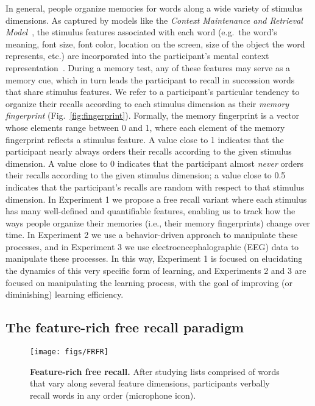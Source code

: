 In general, people organize memories for words along a wide variety of stimulus dimensions.  As captured by models like the \textit{Context Maintenance and Retrieval Model}~\citep{PolyEtal09}, the stimulus features associated with each word (e.g.\ the word's meaning, font size, font color, location on the screen, size of the object the word represents, etc.) are incorporated into the participant's mental context representation~\citep[also see][]{SmitVela01, MannEtal15}.  During a memory test, any of these features may serve as a memory cue, which in turn leads the participant to recall in succession words that share stimulus features.  We refer to a participant's particular tendency to organize their recalls according to each stimulus dimension as their \textit{memory fingerprint} (Fig.~\ref{fig:fingerprint}).  Formally, the memory fingerprint is a vector whose elements range between 0 and 1, where each element of the memory fingerprint reflects a stimulus feature.  A value close to 1 indicates that the participant nearly always orders their recalls according to the given stimulus dimension.  A value close to 0 indicates that the participant almost \textit{never} orders their recalls according to the given stimulus dimension; a value close to 0.5 indicates that the participant's recalls are random with respect to that stimulus dimension.  In Experiment 1 we propose a free recall variant where each stimulus has many well-defined and quantifiable features, enabling us to track how the ways people organize their memories (i.e., their memory fingerprints) change over time.  In Experiment 2 we use a behavior-driven approach to manipulate these processes, and in Experiment 3 we use electroencephalographic (EEG) data to manipulate these processes.  In this way, Experiment 1 is focused on elucidating the dynamics of this very specific form of learning, and Experiments 2 and 3 are focused on manipulating the learning process, with the goal of improving (or diminishing) learning efficiency.


\subsection*{The feature-rich free recall paradigm}

\begin{wrapfigure}[10]{r}{1.4in}
\vspace{-57pt}
  \begin{center}
    \texttt{[image: figs/FRFR]}
  \end{center}
\vspace{-16pt}
  \caption{\footnotesize \textbf{Feature-rich free recall.}  After studying lists comprised of words that vary along several feature dimensions, participants verbally recall words in any order (microphone icon).}
  \label{fig:exp1}
\end{wrapfigure}

